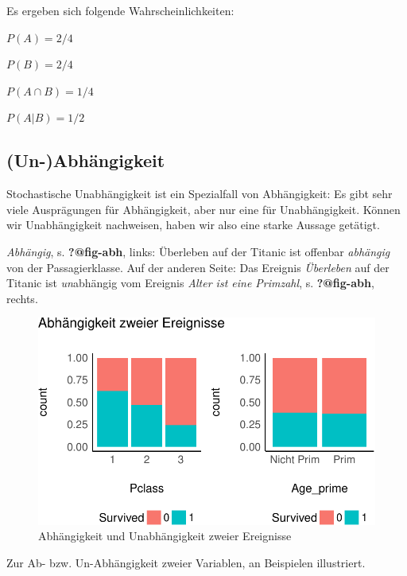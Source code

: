 \documentclass[
  a4paper,
  DIV=11]{scrreprt}
\theoremstyle{definition}
\theoremstyle{remark}
\begin{document}
Es ergeben sich folgende Wahrscheinlichkeiten:

\(P(A) = 2/4\)

\(P(B) = 2/4\)

\(P(A \cap B) = 1/4\)

\(P(A|B) = 1/2\)

\hypertarget{un-abhuxe4ngigkeit}{%
\subsection{(Un-)Abhängigkeit}\label{un-abhuxe4ngigkeit}}

Stochastische Unabhängigkeit ist ein Spezialfall von Abhängigkeit: Es
gibt sehr viele Ausprägungen für Abhängigkeit, aber nur eine für
Unabhängigkeit. Können wir Unabhängigkeit nachweisen, haben wir also
eine starke Aussage getätigt.

\emph{Abhängig}, s. \textbf{?@fig-abh}, links: Überleben auf der Titanic
ist offenbar \emph{abhängig} von der Passagierklasse. Auf der anderen
Seite: Das Ereignis \emph{Überleben} auf der Titanic ist
\emph{un}abhängig vom Ereignis \emph{Alter ist eine Primzahl}, s.
\textbf{?@fig-abh}, rechts.

\begin{figure}

{\centering \includegraphics[width=1\textwidth,height=\textheight]{./Wskt_files/figure-pdf/QM2-Thema1-WasistInferenz-31-1.pdf}

}

\caption{Abhängigkeit und Unabhängigkeit zweier Ereignisse}

\end{figure}

Zur Ab- bzw. Un-Abhängigkeit zweier Variablen, an Beispielen
illustriert.
\end{document}
